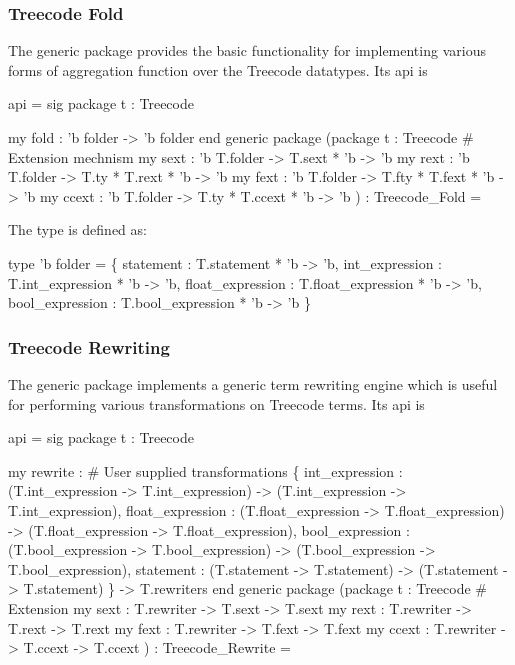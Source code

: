 \subsubsection{Treecode Fold}
The generic package 
provides the basic functionality for implementing various forms of
aggregation function over the Treecode datatypes.  Its api is
\begin{SML}
api  =
sig
   package t : Treecode

   my fold : 'b folder -> 'b folder
end
generic package 
  (package t : Treecode
   #  Extension mechnism 
   my sext  : 'b T.folder -> T.sext * 'b -> 'b
   my rext  : 'b T.folder -> T.ty * T.rext * 'b -> 'b
   my fext  : 'b T.folder -> T.fty * T.fext * 'b -> 'b
   my ccext : 'b T.folder -> T.ty * T.ccext * 'b -> 'b
  ) : Treecode_Fold =
\end{SML}
The type  is defined as:
\begin{SML}
   type 'b folder =
       \{ statement   : T.statement * 'b -> 'b,
         int_expression  : T.int_expression * 'b -> 'b,
         float_expression  : T.float_expression * 'b -> 'b, 
         bool_expression : T.bool_expression * 'b -> 'b
       \}
\end{SML}


\subsubsection{Treecode Rewriting}

The generic package 
implements a generic term rewriting engine which is useful for performing
various transformations on Treecode terms. Its api is
\begin{SML}
api  =
sig
   package t : Treecode

  my rewrite : 
       #  User supplied transformations 
       \{ int_expression  : (T.int_expression -> T.int_expression) -> (T.int_expression -> T.int_expression), 
         float_expression  : (T.float_expression -> T.float_expression) -> (T.float_expression -> T.float_expression),
         bool_expression : (T.bool_expression -> T.bool_expression) -> (T.bool_expression -> T.bool_expression),
         statement   : (T.statement -> T.statement) -> (T.statement -> T.statement)
       \} -> T.rewriters
end
generic package 
  (package t : Treecode
   #  Extension 
   my sext : T.rewriter -> T.sext -> T.sext
   my rext : T.rewriter -> T.rext -> T.rext
   my fext : T.rewriter -> T.fext -> T.fext
   my ccext : T.rewriter -> T.ccext -> T.ccext
  ) : Treecode_Rewrite =
\end{SML}

